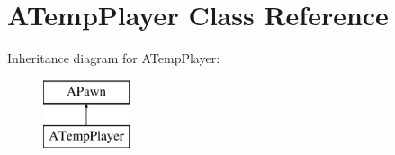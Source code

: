 \hypertarget{class_a_temp_player}{}\section{A\+Temp\+Player Class Reference}
\label{class_a_temp_player}
Inheritance diagram for A\+Temp\+Player\+:\begin{figure}[H]
\begin{center}
\leavevmode
\includegraphics[height=2.000000cm]{class_a_temp_player}
\end{center}
\end{figure}
